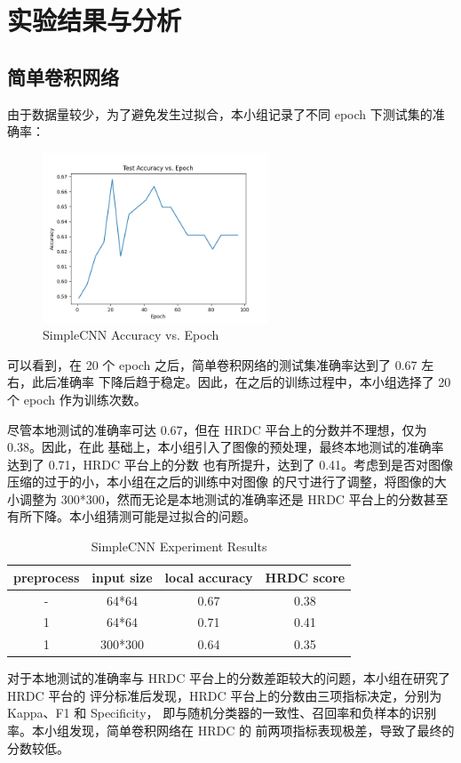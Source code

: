 \documentclass[UTF8,12pt,a4paper]{ctexart}
\begin{document}
\section{实验结果与分析}
\subsection{简单卷积网络}
由于数据量较少，为了避免发生过拟合，本小组记录了不同 epoch 下测试集的准确率：
\begin{figure}[H]
	\centering
	\includegraphics[width=0.6\textwidth]{picture/simplecnn.png}
	\caption{SimpleCNN Accuracy vs. Epoch}
\end{figure}
可以看到，在 20 个 epoch 之后，简单卷积网络的测试集准确率达到了 0.67 左右，此后准确率
下降后趋于稳定。因此，在之后的训练过程中，本小组选择了 20 个 epoch 作为训练次数。

尽管本地测试的准确率可达 0.67，但在 HRDC 平台上的分数并不理想，仅为 0.38。因此，在此
基础上，本小组引入了图像的预处理，最终本地测试的准确率达到了 0.71，HRDC 平台上的分数
也有所提升，达到了 0.41。考虑到是否对图像压缩的过于的小，本小组在之后的训练中对图像
的尺寸进行了调整，将图像的大小调整为 300*300，然而无论是本地测试的准确率还是 HRDC 
平台上的分数甚至有所下降。本小组猜测可能是过拟合的问题。
\begin{table}[H]
    \centering
    \begin{tabular}{|c|c|c|c|}
    \hline
    preprocess & input size & local accuracy & HRDC score \\
    \hline
    - & 64*64 & 0.67 & 0.38 \\
	1 & 64*64 & 0.71 & 0.41 \\
	1 & 300*300 & 0.64 & 0.35 \\
    \hline
    \end{tabular}
    \caption{SimpleCNN Experiment Results}
\end{table}

对于本地测试的准确率与 HRDC 平台上的分数差距较大的问题，本小组在研究了 HRDC 平台的
评分标准后发现，HRDC 平台上的分数由三项指标决定，分别为 Kappa、F1 和 Specificity，
即与随机分类器的一致性、召回率和负样本的识别率。本小组发现，简单卷积网络在 HRDC 的
前两项指标表现极差，导致了最终的分数较低。
\end{document}

